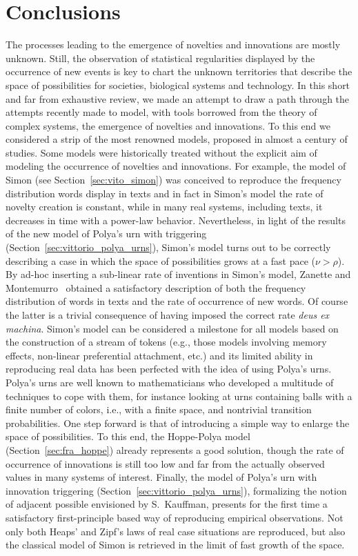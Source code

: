 \documentclass[graybox]{svmult}
\begin{document}
\section{Conclusions}
The processes leading to the emergence of novelties and innovations are mostly unknown. Still, the observation of statistical regularities displayed by the occurrence of new events is key to chart the unknown territories that describe the space of possibilities for societies, biological systems and technology. In this short and far from exhaustive review, we made an attempt to draw a path through the attempts recently made to model, with tools borrowed from the theory of complex systems, the emergence of novelties and innovations. 
To this end we considered a strip of the most renowned models, proposed in almost a century of studies. Some models were historically treated without the explicit aim of modeling the occurrence of novelties and innovations. For example, the model of Simon (see Section~\ref{sec:vito_simon}) was conceived to reproduce the frequency distribution words display in texts and in fact in Simon's model the rate of novelty creation is constant, while in many real systems, including texts, it decreases in time with a power-law behavior. Nevertheless, in light of the results of the new model of Polya's urn with triggering (Section~\ref{sec:vittorio_polya_urns}), Simon's model turns out to be correctly describing a case in which the space of possibilities grows at a fast pace ($\nu>\rho$). By ad-hoc inserting a sub-linear rate of inventions in Simon's model, Zanette and Montemurro~\cite{zanette2005} obtained a satisfactory description of both the frequency distribution of words in texts and the rate of occurrence of new words. Of course the latter is a trivial consequence of having imposed the correct rate \emph{deus ex machina}. Simon's model can be considered a milestone for all models based on the construction of a stream of tokens (e.g., those models involving memory effects, non-linear preferential attachment, etc.) and its limited ability in reproducing real data  has been perfected with the idea of using Polya's urns. Polya's urns are well known to mathematicians who developed a multitude of techniques to cope with them, for instance looking at urns containing balls with a finite number of colors, i.e., with a finite space, and nontrivial transition probabilities. One step forward is that of introducing a simple way to enlarge the space of possibilities. To this end, the Hoppe-Polya model (Section~\ref{sec:fra_hoppe}) already represents a good solution, though the rate of occurrence of innovations is still too low and far from the actually observed values in many systems of interest. Finally, the model of Polya's urn with innovation triggering (Section~\ref{sec:vittorio_polya_urns}), formalizing the notion of adjacent possible envisioned by S.~Kauffman, presents for the first time a satisfactory first-principle based way of reproducing empirical observations. Not only both Heaps' and Zipf's laws of real case situations are reproduced, but also the classical model of Simon is retrieved in the limit of  fast growth of the space. 
\end{document}
